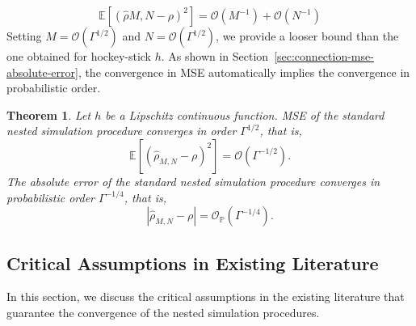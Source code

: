 \documentclass{article}
\newtheorem{theorem}{Theorem}
\begin{document}
\begin{equation}
    \mathbb{E} \left[ \left( \hat{\rho}{M, N} - \rho \right)^2 \right] = \mathcal{O}(M^{-1}) + \mathcal{O}(N^{-1})
\end{equation}
Setting $M = \mathcal{O}(\Gamma^{1/2})$ and $N = \mathcal{O}(\Gamma^{1/2})$, we provide a looser bound than the one obtained for hockey-stick $h$.
As shown in Section~\ref{sec:connection-mse-absolute-error}, the convergence in MSE automatically implies the convergence in probabilistic order.

\begin{theorem}
    Let $h$ be a Lipschitz continuous function. 
    MSE of the standard nested simulation procedure converges in order $\Gamma^{1/2}$, that is,
    $$\mathbb{E} \left[ \left( \hat{\rho}_{M, N} - \rho \right)^2 \right] = \mathcal{O}(\Gamma^{-1/2}).$$
    The absolute error of the standard nested simulation procedure converges in probabilistic order $\Gamma^{-1/4}$, that is,
    $$\left| \hat{\rho}_{M, N} - \rho \right| = \mathcal{O}_\mathbb{P}(\Gamma^{-1/4}).$$
\end{theorem}

\subsection{Critical Assumptions in Existing Literature}
In this section, we discuss the critical assumptions in the existing literature that guarantee the convergence of the nested simulation procedures.
\end{document}

